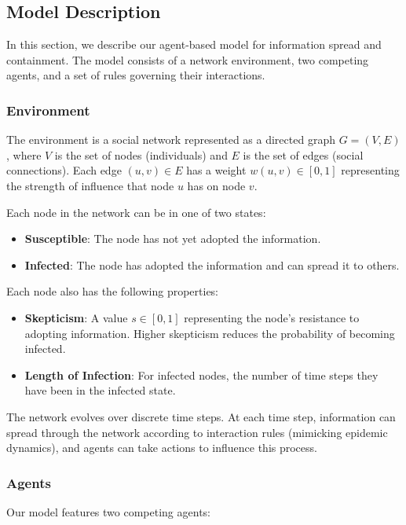 \documentclass[12pt]{article}
\begin{document}
\subsection{Model Description}

In this section, we describe our agent-based model for information spread and containment. The model consists of a network environment, two competing agents, and a set of rules governing their interactions.

\subsubsection{Environment}

The environment is a social network represented as a directed graph $G = (V, E)$, where $V$ is the set of nodes (individuals) and $E$ is the set of edges (social connections). Each edge $(u, v) \in E$ has a weight $w(u, v) \in [0, 1]$ representing the strength of influence that node $u$ has on node $v$.

Each node in the network can be in one of two states:
\begin{itemize}
    \item \textbf{Susceptible}: The node has not yet adopted the information.
    \item \textbf{Infected}: The node has adopted the information and can spread it to others.
\end{itemize}

Each node also has the following properties:
\begin{itemize}
    \item \textbf{Skepticism}: A value $s \in [0, 1]$ representing the node's resistance to adopting information. Higher skepticism reduces the probability of becoming infected.
    \item \textbf{Length of Infection}: For infected nodes, the number of time steps they have been in the infected state.
\end{itemize}

The network evolves over discrete time steps. At each time step, information can spread through the network according to interaction rules (mimicking epidemic dynamics), and agents can take actions to influence this process.

\subsubsection{Agents}

Our model features two competing agents:
\end{document}
